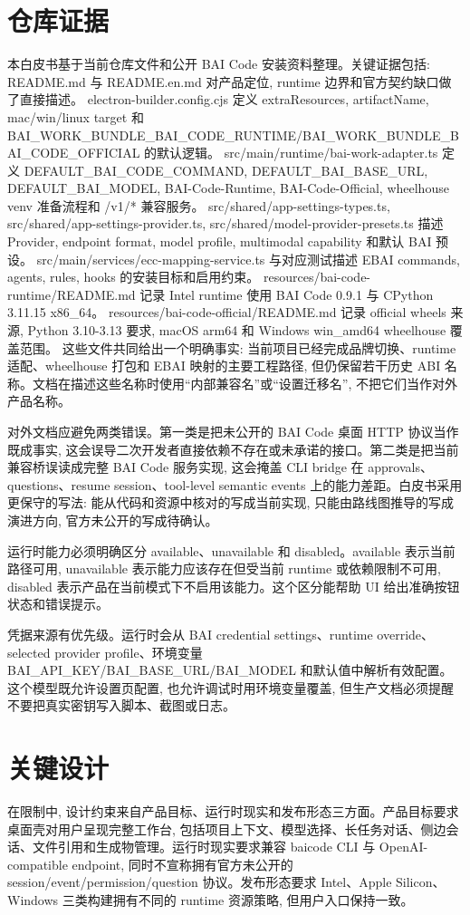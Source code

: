 \section{仓库证据}
本白皮书基于当前仓库文件和公开 BAI Code 安装资料整理。关键证据包括: README.md 与 README.en.md 对产品定位, runtime 边界和官方契约缺口做了直接描述。 electron-builder.config.cjs 定义 extraResources, artifactName, mac/win/linux target 和 BAI\_WORK\_BUNDLE\_BAI\_CODE\_RUNTIME/BAI\_WORK\_BUNDLE\_BAI\_CODE\_OFFICIAL 的默认逻辑。 src/main/runtime/bai-work-adapter.ts 定义 DEFAULT\_BAI\_CODE\_COMMAND, DEFAULT\_BAI\_BASE\_URL, DEFAULT\_BAI\_MODEL, BAI-Code-Runtime, BAI-Code-Official, wheelhouse venv 准备流程和 /v1/* 兼容服务。 src/shared/app-settings-types.ts, src/shared/app-settings-provider.ts, src/shared/model-provider-presets.ts 描述 Provider, endpoint format, model profile, multimodal capability 和默认 BAI 预设。 src/main/services/ecc-mapping-service.ts 与对应测试描述 EBAI commands, agents, rules, hooks 的安装目标和启用约束。 resources/bai-code-runtime/README.md 记录 Intel runtime 使用 BAI Code 0.9.1 与 CPython 3.11.15 x86\_64。 resources/bai-code-official/README.md 记录 official wheels 来源, Python 3.10-3.13 要求, macOS arm64 和 Windows win\_amd64 wheelhouse 覆盖范围。 这些文件共同给出一个明确事实: 当前项目已经完成品牌切换、runtime 适配、wheelhouse 打包和 EBAI 映射的主要工程路径, 但仍保留若干历史 ABI 名称。文档在描述这些名称时使用“内部兼容名”或“设置迁移名”, 不把它们当作对外产品名称。

对外文档应避免两类错误。第一类是把未公开的 BAI Code 桌面 HTTP 协议当作既成事实, 这会误导二次开发者直接依赖不存在或未承诺的接口。第二类是把当前兼容桥误读成完整 BAI Code 服务实现, 这会掩盖 CLI bridge 在 approvals、questions、resume session、tool-level semantic events 上的能力差距。白皮书采用更保守的写法: 能从代码和资源中核对的写成当前实现, 只能由路线图推导的写成演进方向, 官方未公开的写成待确认。

运行时能力必须明确区分 available、unavailable 和 disabled。available 表示当前路径可用, unavailable 表示能力应该存在但受当前 runtime 或依赖限制不可用, disabled 表示产品在当前模式下不启用该能力。这个区分能帮助 UI 给出准确按钮状态和错误提示。

凭据来源有优先级。运行时会从 BAI credential settings、runtime override、selected provider profile、环境变量 BAI\_API\_KEY/BAI\_BASE\_URL/BAI\_MODEL 和默认值中解析有效配置。这个模型既允许设置页配置, 也允许调试时用环境变量覆盖, 但生产文档必须提醒不要把真实密钥写入脚本、截图或日志。

\section{关键设计}
在限制中, 设计约束来自产品目标、运行时现实和发布形态三方面。产品目标要求桌面壳对用户呈现完整工作台, 包括项目上下文、模型选择、长任务对话、侧边会话、文件引用和生成物管理。运行时现实要求兼容 baicode CLI 与 OpenAI-compatible endpoint, 同时不宣称拥有官方未公开的 session/event/permission/question 协议。发布形态要求 Intel、Apple Silicon、Windows 三类构建拥有不同的 runtime 资源策略, 但用户入口保持一致。

